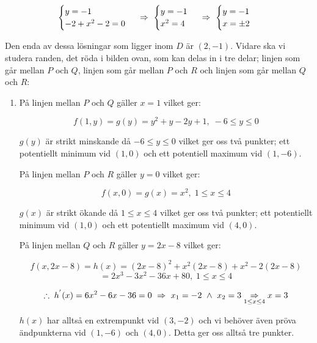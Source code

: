 \documentclass{article}
\begin{document}
\vskip 0.2cm

$$
\begin{cases}
    y=-1 \\
    -2+x^2-2=0
\end{cases}
\ \Rightarrow \ 
\begin{cases}
    y=-1 \\
    x^2=4
\end{cases}
\ \Rightarrow \ 
\begin{cases}
    y=-1 \\
    x=\pm2
\end{cases}
$$

\vskip 0.2cm

Den enda av dessa lösningar som ligger inom $D$ är $(2, -1)$. Vidare ska vi studera randen, det röda i bilden ovan, som kan delas in i tre delar; linjen som går mellan $P$ och $Q$, linjen som går mellan $P$ och $R$ och linjen som går mellan $Q$ och $R$:

\vskip 0.3cm

\begin{enumerate}
    \item[]
        På linjen mellan $P$ och $Q$ gäller $x=1$ vilket ger:

        $$
        f(1, y)=g(y)=y^2+y-2y+1, \; -6\leq y\leq0
        $$

        \vskip 0.2cm

        $g(y)$ är strikt minskande då $-6\leq y\leq0$ vilket ger oss två punkter; ett potentiellt minimum vid $(1, 0)$ och ett potentiell maximum vid $(1, -6)$. 

        \vskip 0.3cm

        På linjen mellan $P$ och $R$ gäller $y=0$ vilket ger:

        $$
        f(x, 0)=g(x)=x^2, \; 1\leq x\leq4
        $$

        \newpage

        $g(x)$ är strikt ökande då $1\leq x\leq4$ vilket ger oss två punkter; ett potentiellt minimum vid $(1, 0)$ och ett potentiellt maximum vid $(4, 0)$.

        \vskip 0.3cm

        På linjen mellan $Q$ och $R$ gäller $y=2x-8$ vilket ger:

        $$
        f(x, 2x-8)=h(x)=(2x-8)^2+x^2(2x-8)+x^2-2(2x-8)
        $$
        $$
        =
        2x^3-3x^2-36x+80,\; 1\leq x\leq4
        $$

        $$
        \therefore\;
        h^{'}(x)=6x^2-6x-36=0
        \ \Rightarrow \ 
        x_{1}=-2 \ \wedge \  x_{2}=3
        \underset{1\leq x\leq4}{\ \Rightarrow \ }
        x=3
        $$

        \vskip 0.2cm

        $h(x)$ har alltså en extrempunkt vid $(3, -2)$ och vi behöver även pröva ändpunkterna vid $(1, -6)$ och $(4, 0)$. Detta ger oss alltså tre punkter.
\end{enumerate}
\end{document}
